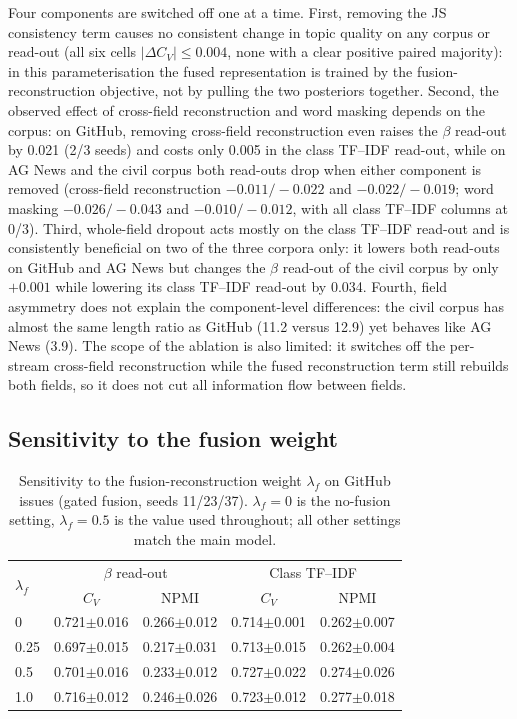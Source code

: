 \documentclass[Journal,letterpaper]{ascelike-new}
\begin{document}
Four components are switched off one at a time. First, removing the JS consistency term causes no
consistent change in topic quality on any corpus or read-out (all six cells
$|\Delta C_V|\leq0.004$, none with a clear positive paired majority): in this
parameterisation the fused representation is trained by the fusion-reconstruction objective, not by
pulling the two posteriors together. Second, the observed effect of cross-field reconstruction
and word masking depends on the corpus: on GitHub, removing cross-field reconstruction even raises
the $\beta$ read-out by 0.021 (2/3 seeds) and costs only 0.005 in the class TF--IDF read-out, while
on AG News and the civil corpus both read-outs drop when either component is removed (cross-field
reconstruction $-0.011/-0.022$ and $-0.022/-0.019$; word masking $-0.026/-0.043$ and
$-0.010/-0.012$, with all class TF--IDF columns at 0/3). Third, whole-field dropout acts mostly on
the class TF--IDF read-out and is consistently beneficial on two of the three corpora only: it
lowers both read-outs on GitHub
and AG News but changes the $\beta$ read-out of the civil corpus by only $+0.001$ while lowering
its class TF--IDF read-out by 0.034. Fourth, field asymmetry does not explain the component-level
differences: the civil corpus has almost the same length ratio as GitHub (11.2 versus 12.9) yet
behaves like AG News (3.9). The scope of the ablation is also limited: it switches off the
per-stream cross-field reconstruction while the fused reconstruction term still rebuilds both
fields, so it does not cut all information flow between fields.

\subsection{Sensitivity to the fusion weight}

\begin{table}[t]
\centering
\caption{Sensitivity to the fusion-reconstruction weight $\lambda_f$ on GitHub issues (gated fusion, seeds 11/23/37). $\lambda_f=0$ is the no-fusion setting, $\lambda_f=0.5$ is the value used throughout; all other settings match the main model.}
\label{tab:weight}
\small
\setlength{\tabcolsep}{4pt}
\begin{tabular}{lcccc}
\toprule
\multirow{2}{*}{$\lambda_f$} & \multicolumn{2}{c}{$\beta$ read-out} & \multicolumn{2}{c}{Class TF--IDF} \\
 & $C_V$ & NPMI & $C_V$ & NPMI \\
\midrule
0 & 0.721$\pm$0.016 & 0.266$\pm$0.012 & 0.714$\pm$0.001 & 0.262$\pm$0.007 \\
0.25 & 0.697$\pm$0.015 & 0.217$\pm$0.031 & 0.713$\pm$0.015 & 0.262$\pm$0.004 \\
0.5 & 0.701$\pm$0.016 & 0.233$\pm$0.012 & 0.727$\pm$0.022 & 0.274$\pm$0.026 \\
1.0 & 0.716$\pm$0.012 & 0.246$\pm$0.026 & 0.723$\pm$0.012 & 0.277$\pm$0.018 \\
\bottomrule
\end{tabular}
\end{table}
\end{document}

